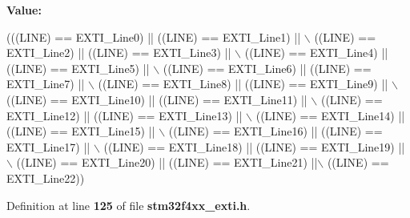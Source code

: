 {\bfseries Value\+:}
\begin{DoxyCode}
(((LINE) == EXTI_Line0) || ((LINE) == EXTI_Line1) || \(\backslash\)
                                ((LINE) == EXTI_Line2) || ((LINE) == EXTI_Line3) || \(\backslash\)
                                ((LINE) == EXTI_Line4) || ((LINE) == EXTI_Line5) || \(\backslash\)
                                ((LINE) == EXTI_Line6) || ((LINE) == EXTI_Line7) || \(\backslash\)
                                ((LINE) == EXTI_Line8) || ((LINE) == EXTI_Line9) || \(\backslash\)
                                ((LINE) == EXTI_Line10) || ((LINE) == 
      EXTI_Line11) || \(\backslash\)
                                ((LINE) == EXTI_Line12) || ((LINE) == 
      EXTI_Line13) || \(\backslash\)
                                ((LINE) == EXTI_Line14) || ((LINE) == 
      EXTI_Line15) || \(\backslash\)
                                ((LINE) == EXTI_Line16) || ((LINE) == 
      EXTI_Line17) || \(\backslash\)
                                ((LINE) == EXTI_Line18) || ((LINE) == 
      EXTI_Line19) || \(\backslash\)
                                ((LINE) == EXTI_Line20) || ((LINE) == 
      EXTI_Line21) ||\(\backslash\)
                                ((LINE) == EXTI_Line22))
\end{DoxyCode}


Definition at line \textbf{ 125} of file \textbf{ stm32f4xx\+\_\+exti.\+h}.

